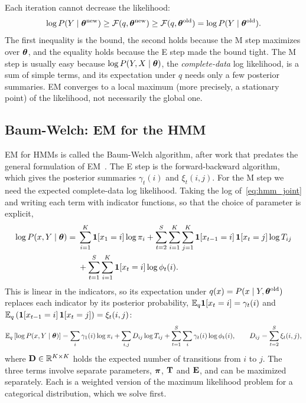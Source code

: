 Each iteration cannot decrease the likelihood:
\begin{equation}
  \log P(Y\mid\boldsymbol{\theta}^{\text{new}}) \geq \mathcal{F}(q,\boldsymbol{\theta}^{\text{new}}) \geq \mathcal{F}(q,\boldsymbol{\theta}^{\text{old}}) = \log P(Y\mid\boldsymbol{\theta}^{\text{old}}).
\end{equation}
The first inequality is the bound, the second holds because the M step maximizes over $\boldsymbol{\theta}$, and the equality holds because the E step made the bound tight. The M step is usually easy because $\log P(Y,X\mid\boldsymbol{\theta})$, the \emph{complete-data} log likelihood, is a sum of simple terms, and its expectation under $q$ needs only a few posterior summaries. EM converges to a local maximum (more precisely, a stationary point) of the likelihood, not necessarily the global one.

\subsection{Baum-Welch: EM for the HMM}

EM for HMMs is called the Baum-Welch algorithm, after work that predates the general formulation of EM~\citep{baum1970}. The E step is the forward-backward algorithm, which gives the posterior summaries $\gamma_t(i)$ and $\xi_t(i,j)$. For the M step we need the expected complete-data log likelihood. Taking the log of~\eqref{eq:hmm_joint} and writing each term with indicator functions, so that the choice of parameter is explicit,
\begin{equation}
\begin{split}
  \log P(x,Y\mid\boldsymbol{\theta}) = {}&\sum_{i=1}^K\mathbf{1}[x_1=i]\log\pi_i + \sum_{t=2}^S\sum_{i=1}^K\sum_{j=1}^K\mathbf{1}[x_{t-1}=i]\,\mathbf{1}[x_t=j]\log T_{ij} \\
  &+ \sum_{t=1}^S\sum_{i=1}^K\mathbf{1}[x_t=i]\log\phi_t(i).
\end{split}
\end{equation}
This is linear in the indicators, so its expectation under $q(x)=P(x\mid Y,\boldsymbol{\theta}^{\text{old}})$ replaces each indicator by its posterior probability, $\mathbb{E}_q\mathbf{1}[x_t=i]=\gamma_t(i)$ and $\mathbb{E}_q\left(\mathbf{1}[x_{t-1}=i]\,\mathbf{1}[x_t=j]\right)=\xi_t(i,j)$:
\begin{equation}
  \mathbb{E}_q\left[\log P(x,Y\mid\boldsymbol{\theta})\right] = \sum_{i}\gamma_1(i)\log\pi_i + \sum_{i,j}D_{ij}\log T_{ij} + \sum_{t=1}^S\sum_{i}\gamma_t(i)\log\phi_t(i),
  \qquad D_{ij}=\sum_{t=2}^S\xi_t(i,j),
  \label{eq:expected_cll}
\end{equation}
where $\mathbf{D}\in\mathbb{R}^{K\times K}$ holds the expected number of transitions from $i$ to $j$. The three terms involve separate parameters, $\boldsymbol{\pi}$, $\mathbf{T}$ and $\mathbf{E}$, and can be maximized separately. Each is a weighted version of the maximum likelihood problem for a categorical distribution, which we solve first.

